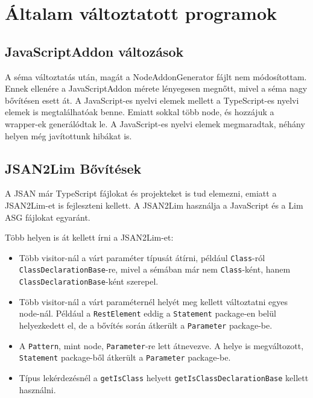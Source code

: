 \chapter{Általam változtatott programok}\label{chap:altalam_valtoztatott_programok}

\section{JavaScriptAddon változások}

\noindent


A séma változtatás után, magát a NodeAddonGenerator fájlt nem módosítottam.
Ennek ellenére a JavaScriptAddon mérete lényegesen megnőtt, mivel a séma nagy bővítésen esett át.
A JavaScript-es nyelvi elemek mellett a TypeScript-es nyelvi elemek is megtalálhatóak benne.
Emiatt sokkal több node, és hozzájuk a wrapper-ek generálódtak le.
A JavaScript-es nyelvi elemek megmaradtak, néhány helyen még javítottunk hibákat is.

\section{JSAN2Lim Bővítések}

\noindent

A JSAN már TypeScript fájlokat és projekteket is tud elemezni, emiatt a JSAN2Lim-et is fejleszteni kellett.
A JSAN2Lim használja a JavaScript és a Lim ASG fájlokat egyaránt.

Több helyen is át kellett írni a JSAN2Lim-et:
\begin{itemize}
      \item Több visitor-nál a várt paraméter típusát átírni, például \texttt{Class}-ról \texttt{ClassDeclarationBase}-re,
      mivel a sémában már nem \texttt{Class}-ként, hanem \texttt{ClassDeclarationBase}-ként szerepel.
      \item Több visitor-nál a várt paraméternél helyét meg kellett változtatni egyes node-nál.
      Például a \texttt{RestElement} eddig a \texttt{Statement} package-en belül helyezkedett el, de a bővítés során átkerült a \texttt{Parameter} package-be.
      \item A \texttt{Pattern}, mint node, \texttt{Parameter}-re lett átnevezve. A helye is megváltozott, \texttt{Statement} package-ből átkerült a \texttt{Parameter} package-be.
      \item Típus lekérdezésnél a \texttt{getIsClass} helyett \texttt{getIsClassDeclarationBase} kellett használni.
\end{itemize}

